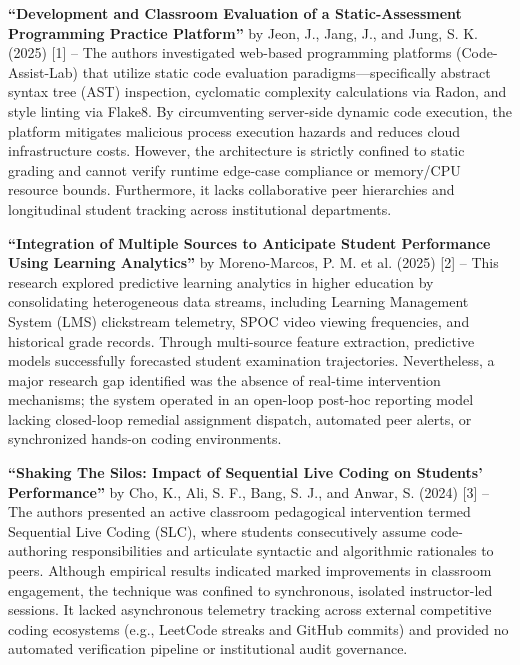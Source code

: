 {\fontsize{11pt}{15.5pt}\selectfont
\textbf{``Development and Classroom Evaluation of a Static-Assessment Programming Practice Platform''} by Jeon, J., Jang, J., and Jung, S. K. (2025) [1] -- The authors investigated web-based programming platforms (Code-Assist-Lab) that utilize static code evaluation paradigms---specifically abstract syntax tree (AST) inspection, cyclomatic complexity calculations via Radon, and style linting via Flake8. By circumventing server-side dynamic code execution, the platform mitigates malicious process execution hazards and reduces cloud infrastructure costs. However, the architecture is strictly confined to static grading and cannot verify runtime edge-case compliance or memory/CPU resource bounds. Furthermore, it lacks collaborative peer hierarchies and longitudinal student tracking across institutional departments.

\vspace{0.2cm}
\textbf{``Integration of Multiple Sources to Anticipate Student Performance Using Learning Analytics''} by Moreno-Marcos, P. M. et al. (2025) [2] -- This research explored predictive learning analytics in higher education by consolidating heterogeneous data streams, including Learning Management System (LMS) clickstream telemetry, SPOC video viewing frequencies, and historical grade records. Through multi-source feature extraction, predictive models successfully forecasted student examination trajectories. Nevertheless, a major research gap identified was the absence of real-time intervention mechanisms; the system operated in an open-loop post-hoc reporting model lacking closed-loop remedial assignment dispatch, automated peer alerts, or synchronized hands-on coding environments.

\vspace{0.2cm}
\textbf{``Shaking The Silos: Impact of Sequential Live Coding on Students' Performance''} by Cho, K., Ali, S. F., Bang, S. J., and Anwar, S. (2024) [3] -- The authors presented an active classroom pedagogical intervention termed Sequential Live Coding (SLC), where students consecutively assume code-authoring responsibilities and articulate syntactic and algorithmic rationales to peers. Although empirical results indicated marked improvements in classroom engagement, the technique was confined to synchronous, isolated instructor-led sessions. It lacked asynchronous telemetry tracking across external competitive coding ecosystems (e.g., LeetCode streaks and GitHub commits) and provided no automated verification pipeline or institutional audit governance.

\par}
\newpage

